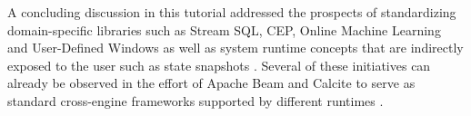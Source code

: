A concluding discussion in this tutorial addressed the prospects of standardizing domain-specific libraries such as Stream SQL, CEP, Online Machine Learning and User-Defined Windows \cite{carbone2015cutty} as well as system runtime concepts that are indirectly exposed to the user such as state snapshots \cite{state2017carbone}. Several of these initiatives can already be observed in the effort of Apache Beam \cite{CUSTOM:web/beam} and Calcite \cite{CUSTOM:web/calcite} to serve as standard cross-engine frameworks supported by different runtimes \cite{CUSTOM:web/beamcapabilitymatrix}.
